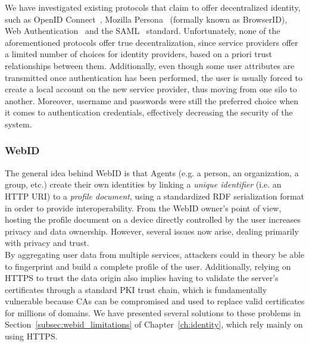 We have investigated existing protocols that claim to offer decentralized identity, such as OpenID Connect~\cite{sakimura2011openid}, Mozilla Persona~\cite{browserid} (formally known as BrowserID), Web Authentication~\cite{dahl2013web} and the SAML~\cite{hallam2001security} standard. Unfortunately, none of the aforementioned protocols offer true decentralization, since service providers offer a limited number of choices for identity providers, based on a priori trust relationships between them. Additionally, even though some user attributes are transmitted once authentication has been performed, the user is usually forced to create a local account on the new service provider, thus moving from one silo to another. Moreover, username and passwords were still the preferred choice when it comes to authentication credentials, effectively decreasing the security of the system.\\

\subsubsection{WebID}
The general idea behind WebID is that Agents (e.g. a person, an organization, a group, etc.) create their own identities by linking a \textit{unique identifier} (i.e. an HTTP URI) to a \textit{profile document}, using a standardized RDF serialization format in order to provide interoperability. From the WebID owner's point of view, hosting the profile document on a device directly controlled by the user increases privacy and data ownership. However, several issues now arise, dealing primarily with privacy and trust.\\

By aggregating user data from multiple services, attackers could in theory be able to fingerprint and build a complete profile of the user. Additionally, relying on HTTPS to trust the data origin also implies having to validate the server's certificates through a standard PKI trust chain, which is fundamentally vulnerable because CAs can be compromised and used to replace valid certificates for millions of domains. We have presented several solutions to these problems in Section~\ref{subsec:webid_limitations} of Chapter~\ref{ch:identity}, which rely mainly on using HTTPS.\\


